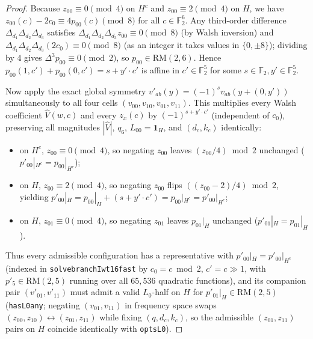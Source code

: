 \documentclass[11pt]{article}
\theoremstyle{definition}
\theoremstyle{remark}
\newcommand{\F}{\mathbb{F}}
\newcommand{\ind}{\mathbf{1}}
\newcommand{\RM}{\mathrm{RM}}
\newcommand{\code}[1]{\texttt{#1}}
\DeclareRobustCommand{\_}{\textunderscore\allowbreak}
\begin{document}
\begin{proof}
Because $z_{00}\equiv0\pmod 4$ on $H^c$ and $z_{00}\equiv2\pmod 4$ on $H$, we have $z_{00}(c)-2c_0\equiv4p_{00}(c)\pmod 8$ for all $c\in\F_2^6$. Any third-order difference $\Delta_{d_1}\Delta_{d_2}\Delta_{d_3}$ satisfies $\Delta_{d_1}\Delta_{d_2}\Delta_{d_3}z_{00}\equiv0\pmod 8$ (by Walsh inversion) and $\Delta_{d_1}\Delta_{d_2}\Delta_{d_3}(2c_0)\equiv0\pmod 8$ (as an integer it takes values in $\{0,\pm8\}$); dividing by $4$ gives $\Delta^3 p_{00}\equiv0\pmod 2$, so $p_{00}\in\RM(2,6)$. Hence $p_{00}(1,c')+p_{00}(0,c')=s+y'\cdot c'$ is affine in $c'\in\F_2^5$ for some $s\in\F_2, y'\in\F_2^5$.

Now apply the exact global symmetry $v'_{ab}(y)=(-1)^s v_{ab}(y+(0,y'))$ simultaneously to all four cells $(v_{00},v_{10},v_{01},v_{11})$. This multiplies every Walsh coefficient $\widehat V(w,c)$ and every $z_x(c)$ by $(-1)^{s+y'\cdot c'}$ (independent of $c_0$), preserving all magnitudes $|\widehat V|$, $q_6$, $L_{00}=\ind_H$, and $(d_c,k_c)$ identically:
\begin{itemize}[nosep]
  \item on $H^c$, $z_{00}\equiv0\pmod 4$, so negating $z_{00}$ leaves $(z_{00}/4)\bmod2$ unchanged ($p'_{00}|_{H^c}=p_{00}|_{H^c}$);
  \item on $H$, $z_{00}\equiv2\pmod 4$, so negating $z_{00}$ flips $((z_{00}-2)/4)\bmod2$, yielding $p'_{00}|_H=p_{00}|_H+(s+y'\cdot c')=p_{00}|_{H^c}=p'_{00}|_{H^c}$;
  \item on $H$, $z_{01}\equiv0\pmod 4$, so negating $z_{01}$ leaves $p_{01}|_H$ unchanged ($p'_{01}|_H=p_{01}|_H$).
\end{itemize}
Thus every admissible configuration has a representative with $p'_{00}|_H=p'_{00}|_{H^c}$ (indexed in \code{solve\_branchI\_wt16\_fast} by $c_0=c\bmod2$, $c'=c\gg1$, with $p'_5\in\RM(2,5)$ running over all $65{,}536$ quadratic functions), and its companion pair $(v'_{01},v'_{11})$ must admit a valid $L_0$-half on $H$ for $p'_{01}|_H\in\RM(2,5)$ (\code{has\_L0\_any}; negating $(v_{01},v_{11})$ in frequency space swaps $(z_{00},z_{10})\leftrightarrow(z_{01},z_{11})$ while fixing $(q,d_c,k_c)$, so the admissible $(z_{01},z_{11})$ pairs on $H$ coincide identically with \code{opts\_L0}).


\end{proof}
\end{document}
